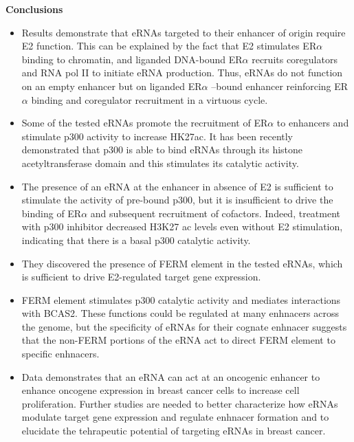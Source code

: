 \textbf{Conclusions}
\begin{itemize}
\item Results demonstrate that eRNAs targeted to their enhancer of origin require E2 function. This can be
explained by the fact that E2 stimulates ER$\alpha$ binding to chromatin, and liganded DNA-bound ER$\alpha$
recruits coregulators and RNA pol II to initiate eRNA production. Thus, eRNAs do not function on an
empty enhancer but on liganded ER$\alpha$ –bound enhancer reinforcing ER$\alpha$ binding and coregulator
recruitment in a virtuous cycle.
\item Some of the tested eRNAs promote the recruitment of ER$\alpha$ to enhancers and stimulate p300 activity
to increase HK27ac. It has been recently demonstrated that p300 is able to bind eRNAs through its
histone acetyltransferase domain and this stimulates its catalytic activity.
\item The presence of an eRNA at the enhancer in absence of E2 is sufficient to stimulate the activity of
pre-bound p300, but it is insufficient to drive the binding of ER$\alpha$ and subsequent recruitment of
cofactors. Indeed, treatment with p300 inhibitor decreased H3K27 ac levels even without E2
stimulation, indicating that there is a basal p300 catalytic activity.
\item They discovered the presence of FERM element in the tested eRNAs, which is sufficient to drive
E2-regulated target gene expression.
\item FERM element stimulates p300 catalytic activity and mediates interactions with BCAS2. These
functions could be regulated at many enhnacers across the genome, but the specificity of eRNAs
for their cognate enhnacer suggests that the non-FERM portions of the eRNA act to direct FERM
element to specific enhnacers.
\item Data demonstrates that an eRNA can act at an oncogenic enhancer to enhance oncogene
expression in breast cancer cells to increase cell proliferation. Further studies are needed to
better characterize how eRNAs modulate target gene expression and regulate enhnacer
formation and to elucidate the tehrapeutic potential of targeting eRNAs in breast cancer.
\end{itemize}


